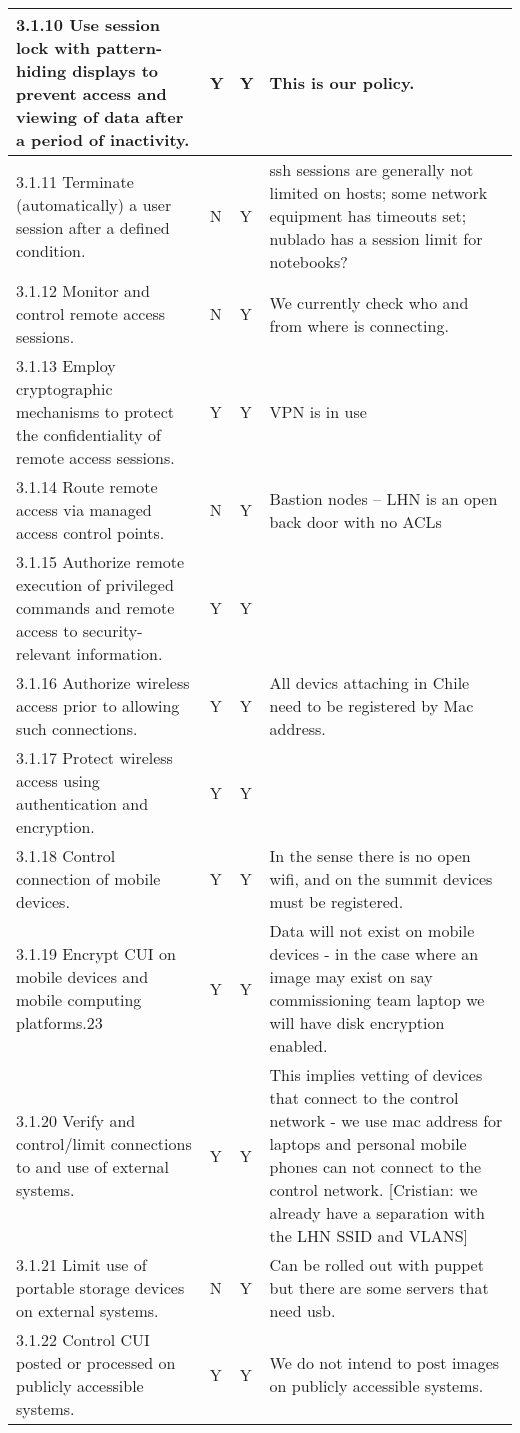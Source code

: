 \begin{longtable} {|p{}|p{}|p{}|p{} |}
{3.1.10 Use session lock with pattern-hiding displays to prevent access and viewing of data after a period of inactivity.}&{Y}&{Y}&{This is our policy.} \\ \hline
{3.1.11 Terminate (automatically) a user session after a defined condition.}&{N}&{Y}&{ssh sessions are generally not limited on hosts; some network equipment has timeouts set; nublado has a session limit for notebooks?} \\ \hline
{3.1.12 Monitor and control remote access sessions.}&{N}&{Y}&{We currently check who and from where is connecting.} \\ \hline
{3.1.13 Employ cryptographic mechanisms to protect the confidentiality of remote access sessions.}&{Y}&{Y}&{VPN is in use} \\ \hline
{3.1.14 Route remote access via managed access control points.}&{N}&{Y}&{Bastion nodes -- LHN is an open back door with no ACLs} \\ \hline
{3.1.15 Authorize remote execution of privileged commands and remote access to security-relevant information.}&{Y}&{Y}& \\ \hline
{3.1.16 Authorize wireless access prior to allowing such connections.}&{Y}&{Y}&{All devics attaching in Chile need to be registered by Mac address.} \\ \hline
{3.1.17 Protect wireless access using authentication and encryption.}&{Y}&{Y}& \\ \hline
{3.1.18 Control connection of mobile devices.}&{Y}&{Y}&{In the sense there is no open wifi, and on the summit devices must be registered. } \\ \hline
{3.1.19 Encrypt CUI on mobile devices and mobile computing platforms.23}&{Y}&{Y}&{Data will not exist on mobile devices - in the case where an image may exist on say commissioning team laptop we will have disk encryption enabled. } \\ \hline
{3.1.20 Verify and control/limit connections to and use of external systems.}&{Y}&{Y}&{This implies vetting of devices that connect to the control network - we use mac address for laptops and personal mobile phones can not connect to the control network. [Cristian: we already have a separation with the LHN SSID and VLANS]} \\ \hline
{3.1.21 Limit use of portable storage devices on external systems.}&{N}&{Y}&{Can be rolled out with puppet but there are some servers that need usb. } \\ \hline
{3.1.22 Control CUI posted or processed on publicly accessible systems.}&{Y}&{Y}&{We do not intend to post images on publicly accessible systems. } \\ \hline

\end{longtable}
